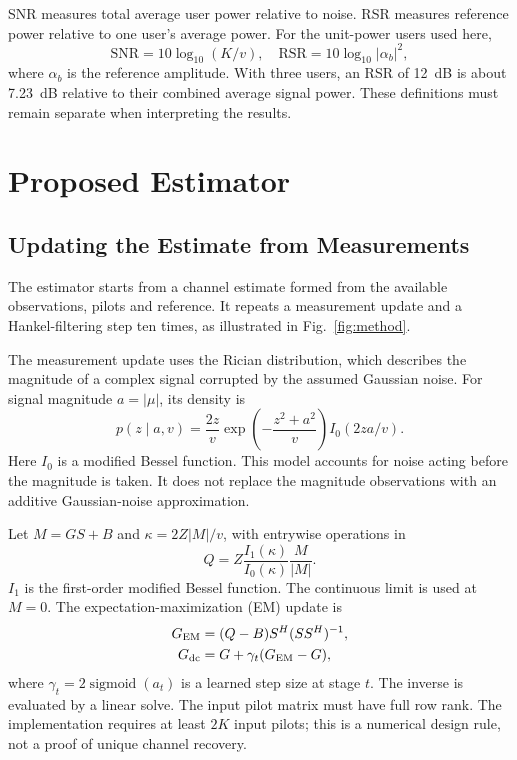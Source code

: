 \documentclass[journal]{IEEEtran}
\DeclareMathOperator{\sigmoid}{sigmoid}
\begin{document}
SNR measures total average user power relative to noise. RSR measures
reference power relative to one user's average power. For the unit-power
users used here,
\begin{equation}
 \mathrm{SNR}=10\log_{10}(K/v),\quad
 \mathrm{RSR}=10\log_{10}|\alpha_b|^2,
\end{equation}
where $\alpha_b$ is the reference amplitude. With three users, an RSR of
12~dB is about 7.23~dB relative to their combined average signal power.
These definitions must remain separate when interpreting the results.

\section{Proposed Estimator}
\subsection{Updating the Estimate from Measurements}
The estimator starts from a channel estimate formed from the available
observations, pilots and reference. It repeats a measurement update and a
Hankel-filtering step ten times, as illustrated in Fig.~\ref{fig:method}.

The measurement update uses the Rician distribution, which describes the
magnitude of a complex signal corrupted by the assumed Gaussian noise.
For signal magnitude $a=|\mu|$, its density is
\begin{equation}
 p(z\mid a,v)=\frac{2z}{v}
 \exp\left(-\frac{z^2+a^2}{v}\right)I_0(2za/v).
\end{equation}
Here $I_0$ is a modified Bessel function. This model accounts for noise
acting before the magnitude is taken. It does not replace the magnitude
observations with an additive Gaussian-noise approximation.

Let $M=GS+B$ and $\kappa=2Z|M|/v$, with entrywise operations in
\begin{equation}
 Q=Z\frac{I_1(\kappa)}{I_0(\kappa)}\frac{M}{|M|}.
\end{equation}
$I_1$ is the first-order modified Bessel function. The continuous limit is
used at $M=0$. The expectation-maximization (EM) update is
\begin{align}
 G_{\rm EM}&=(Q-B)S^H(SS^H)^{-1},\\
 G_{\rm dc}&=G+\gamma_t(G_{\rm EM}-G),
 \label{eq:dc}
\end{align}
where $\gamma_t=2\sigmoid(a_t)$ is a learned step size at stage $t$.
The inverse is evaluated by a linear solve. The input pilot matrix must
have full row rank. The implementation requires at least $2K$ input pilots;
this is a numerical design rule, not a proof of unique channel recovery.
\end{document}
